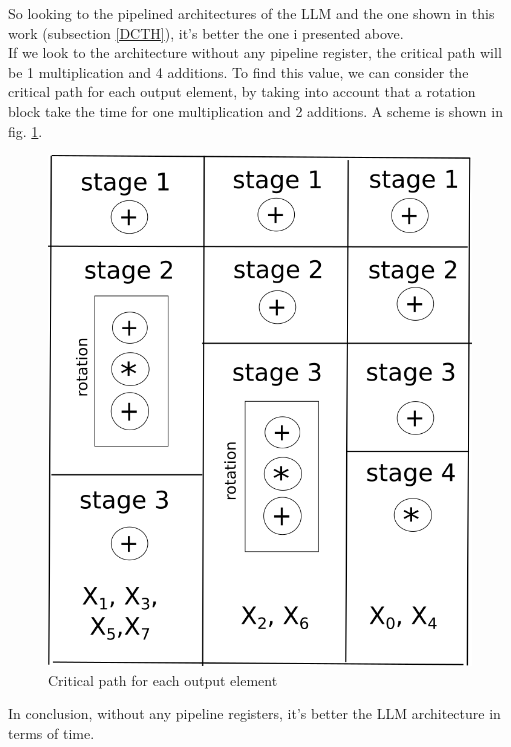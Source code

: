      So looking to the pipelined architectures of the LLM and the one shown in this work (subsection \ref{DCTH}), it's better the one i presented above.\\
     If we look to the architecture without any pipeline register, the critical path will be 1 multiplication and 4 additions. To find this value, we can consider the critical path for each output element, by taking into account that a rotation block take the time for one multiplication and 2 additions.
     A scheme is shown in fig. \ref{dfg_llm}.
               \begin{figure}[h!]
               	\centering	
               	\includegraphics[width=\textwidth]{imm/dct/dfg_llm.png}  
               	\caption{Critical path for each output element} 
               	\label{dfg_llm}
               \end{figure}
      In conclusion, without any pipeline registers, it's better the LLM architecture in terms of time.
 
          \clearpage        
          \newpage
